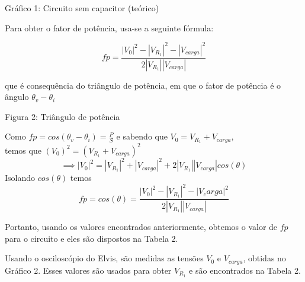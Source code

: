 \documentclass[a4 paper]{article}
\begin{document}
\begin{center}
Gráfico 1: Circuito sem capacitor (teórico)
\end{center}

\newpage


Para obter o fator de potência, usa-se a seguinte fórmula:

\[fp = \frac{|V_0|^2-|V_{R_1}|^2-|V_{carga}|^2}{2|V_{R_1}||V_{carga}|}\]

que é consequência do triângulo de potência, em que o fator de potência é o ângulo $\theta_v-\theta_i$



\begin{center}
\end{center}

\begin{center}
Figura 2: Triângulo de potência
\end{center}


Como $fp=cos(\theta_v-\theta_i)=\frac{P}{S}$ e sabendo que $V_0=V_{R_1}+V_{carga}$, \\temos que $(V_0)^2=(V_{R_1}+V_{carga})^2$
\[\implies|V_0|^2=|V_{R_1}|^2 + |V_{carga}|^2+2|V_{R_1}||V_{carga}|cos(\theta)\]
Isolando $cos(\theta)$ temos 
\[fp = cos(\theta)= \frac{|V_0|^2-|V_{R_1}|^2-|V_carga|^2}{2|V_{R_1}||V_{carga}|}\]

Portanto, usando os valores encontrados anteriormente, obtemos o valor de $fp$ para o circuito e eles são dispostos na Tabela 2.

Usando o osciloscópio do Elvis, são medidas as tensões $V_0$ e $V_{carga}$, obtidas no Gráfico 2. Esses valores são usados para obter $V_{R_1}$ e são encontrados na Tabela 2. 
\end{document}
